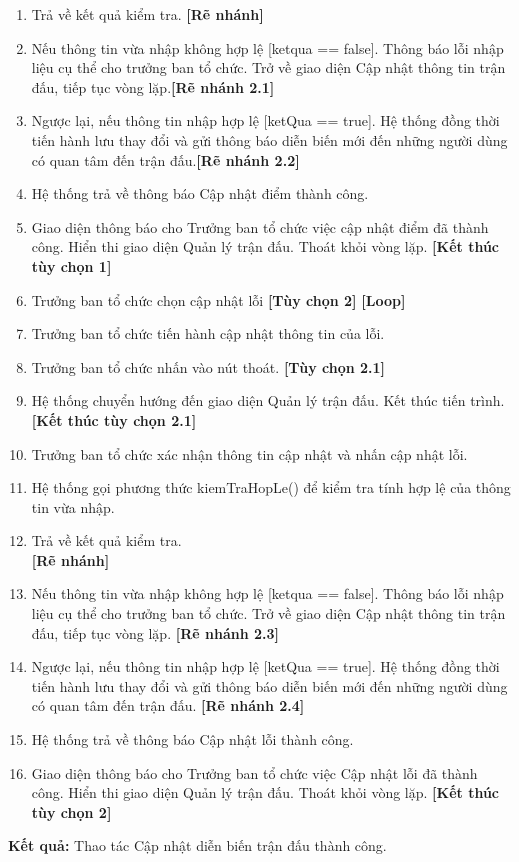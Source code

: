 \begin{enumerate}
      \item Trả về kết quả kiểm tra.
            \textbf{[Rẽ nhánh]}
      \item Nếu thông tin vừa nhập không hợp lệ [ketqua == false]. Thông báo lỗi nhập liệu cụ thể cho trưởng ban tổ chức. Trở về giao diện Cập nhật thông tin trận đấu, tiếp tục vòng lặp.\textbf{[Rẽ nhánh 2.1]}
      \item Ngược lại, nếu thông tin nhập hợp lệ [ketQua == true]. Hệ thống đồng thời tiến hành lưu thay đổi và gửi thông báo diễn biến mới đến những người dùng có quan tâm đến trận đấu.\textbf{[Rẽ nhánh 2.2]}
      \item Hệ thống trả về thông báo Cập nhật điểm thành công.
      \item Giao diện thông báo cho Trưởng ban tổ chức việc cập nhật điểm đã thành công. Hiển thi giao diện Quản lý trận đấu. Thoát khỏi vòng lặp.
            \textbf{[Kết thúc tùy chọn 1]}
      \item Trưởng ban tổ chức chọn cập nhật lỗi \textbf{[Tùy chọn 2]}
            \textbf{[Loop]}
      \item Trưởng ban tổ chức tiến hành cập nhật thông tin của lỗi.
      \item Trưởng ban tổ chức nhấn vào nút thoát. \textbf{[Tùy chọn 2.1]}
      \item Hệ thống chuyển hướng đến giao diện Quản lý trận đấu. Kết thúc tiến trình. \\
            \textbf{[Kết thúc tùy chọn 2.1]}
      \item Trưởng ban tổ chức xác nhận thông tin cập nhật và nhấn cập nhật lỗi.
      \item Hệ thống gọi phương thức kiemTraHopLe() để kiểm tra tính hợp lệ của thông tin vừa nhập.
      \item Trả về kết quả kiểm tra.\\
            \textbf{[Rẽ nhánh]}
      \item Nếu thông tin vừa nhập không hợp lệ [ketqua == false]. Thông báo lỗi nhập liệu cụ thể cho trưởng ban tổ chức. Trở về giao diện Cập nhật thông tin trận đấu, tiếp tục vòng lặp. \textbf{[Rẽ nhánh 2.3]}
      \item Ngược lại, nếu thông tin nhập hợp lệ [ketQua == true]. Hệ thống đồng thời tiến hành lưu thay đổi và gửi thông báo diễn biến mới đến những người dùng có quan tâm đến trận đấu. \textbf{[Rẽ nhánh 2.4]}
      \item Hệ thống trả về thông báo Cập nhật lỗi thành công.
      \item Giao diện thông báo cho Trưởng ban tổ chức việc Cập nhật lỗi đã thành công. Hiển thi giao diện Quản lý trận đấu. Thoát khỏi vòng lặp.
            \textbf{[Kết thúc tùy chọn 2]}
\end{enumerate}

\noindent
\textbf{Kết quả:} Thao tác Cập nhật diễn biến trận đấu thành công.

